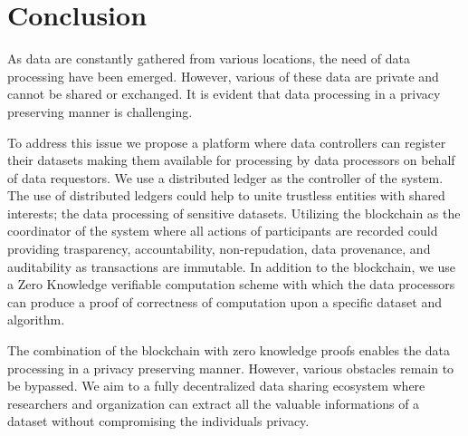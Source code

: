 \chapter{Conclusion}
\label{conclusion}

As data are constantly gathered from various locations, the need of data processing have been emerged. However, various of these data are private and cannot be shared or exchanged. It is evident that data processing in a privacy preserving manner is challenging.

To address this issue we propose a platform where data controllers can register their datasets making them available for processing by data processors on behalf of data requestors. We use a distributed ledger as the controller of the system. The use of distributed ledgers could help to unite trustless entities with shared interests; the data processing of sensitive datasets. Utilizing the blockchain as the coordinator of the system where all actions of participants are recorded could providing trasparency, accountability, non-repudation, data provenance, and auditability as transactions are immutable. In addition to the blockchain, we use a Zero Knowledge verifiable computation scheme with which the data processors can produce a proof of correctness of computation upon a specific dataset and algorithm.

The combination of the blockchain with zero knowledge proofs enables the data processing in a privacy preserving manner. However, various obstacles remain to be bypassed. We aim to a fully decentralized data sharing ecosystem where researchers and organization can extract all the valuable informations of a dataset without compromising the individuals privacy.
